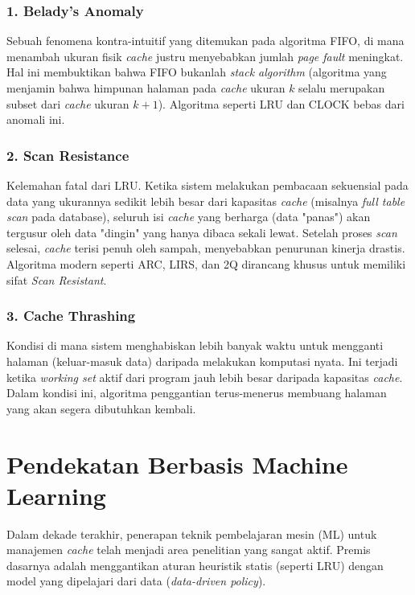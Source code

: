 \subsubsection{1. Belady's Anomaly}
Sebuah fenomena kontra-intuitif yang ditemukan pada algoritma FIFO,
di mana menambah ukuran fisik \textit{cache} justru menyebabkan
jumlah \textit{page fault} meningkat.
Hal ini membuktikan bahwa FIFO bukanlah \textit{stack algorithm}
(algoritma yang menjamin bahwa himpunan halaman pada \textit{cache}
ukuran $k$ selalu merupakan subset dari \textit{cache} ukuran $k+1$).
Algoritma seperti LRU dan CLOCK bebas dari anomali ini.

\subsubsection{2. Scan Resistance}
Kelemahan fatal dari LRU. Ketika sistem melakukan pembacaan
sekuensial pada data yang ukurannya sedikit lebih besar dari
kapasitas \textit{cache} (misalnya \textit{full table scan} pada
database), seluruh isi \textit{cache} yang berharga (data "panas")
akan tergusur oleh data "dingin" yang hanya dibaca sekali lewat.
Setelah proses \textit{scan} selesai, \textit{cache} terisi penuh
oleh sampah, menyebabkan penurunan kinerja drastis.
Algoritma modern seperti ARC, LIRS, dan 2Q dirancang khusus untuk
memiliki sifat \textit{Scan Resistant}.

\subsubsection{3. Cache Thrashing}
Kondisi di mana sistem menghabiskan lebih banyak waktu untuk
mengganti halaman (keluar-masuk data) daripada melakukan komputasi
nyata. Ini terjadi ketika \textit{working set} aktif dari program
jauh lebih besar daripada kapasitas \textit{cache}.
Dalam kondisi ini, algoritma penggantian terus-menerus membuang
halaman yang akan segera dibutuhkan kembali.

\section{Pendekatan Berbasis Machine Learning}
Dalam dekade terakhir, penerapan teknik pembelajaran mesin (ML) untuk
manajemen \textit{cache} telah menjadi area penelitian yang sangat aktif.
Premis dasarnya adalah menggantikan aturan heuristik statis (seperti LRU)
dengan model yang dipelajari dari data (\textit{data-driven policy}).

